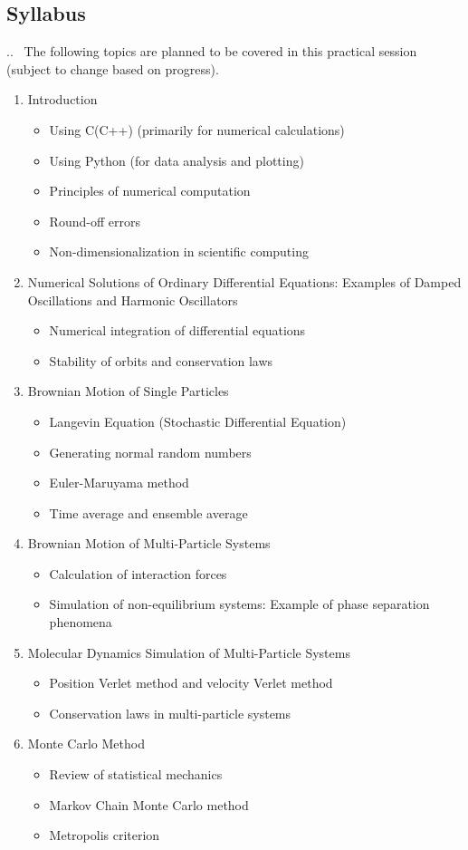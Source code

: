 \documentclass[aspectratio=169,dvipdfmx,cjk,handout,hyperref,8pt]{beamer} %
\theoremstyle{example}
\newcommand{\bi}{\begin{itemize}}
\newcommand{\ei}{\end{itemize}}
\begin{document}
\subsection{Syllabus} 
\begin{frame}{\thesection.\thesubsection.~\insertsubsection} 
The following topics are planned to be covered in this practical session (subject to change based on progress).
\begin{enumerate}
\item Introduction
\bi
\item Using C(C++) (primarily for numerical calculations)
\item Using Python (for data analysis and plotting)
\item Principles of numerical computation
\item Round-off errors
\item Non-dimensionalization in scientific computing
\ei
\item Numerical Solutions of Ordinary Differential Equations: Examples of Damped Oscillations and Harmonic Oscillators
\bi
\item Numerical integration of differential equations
\item Stability of orbits and conservation laws
\ei
\item Brownian Motion of Single Particles
\bi
\item Langevin Equation (Stochastic Differential Equation)
\item Generating normal random numbers
\item Euler-Maruyama method
\item Time average and ensemble average
\ei
\item Brownian Motion of Multi-Particle Systems
\bi
\item Calculation of interaction forces
\item Simulation of non-equilibrium systems: Example of phase separation phenomena
\ei
\item Molecular Dynamics Simulation of Multi-Particle Systems
\bi
\item Position Verlet method and velocity Verlet method
\item Conservation laws in multi-particle systems
\ei
\item Monte Carlo Method
\bi
\item Review of statistical mechanics
\item Markov Chain Monte Carlo method
\item Metropolis criterion
\ei
\end{enumerate}
\end{frame}
\end{document}
